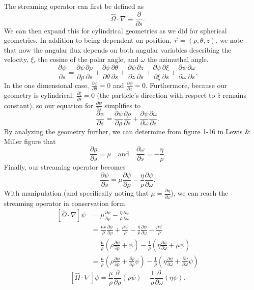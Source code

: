 \documentclass{article}
\newcommand{\p}{\partial}
\newcommand{\pos}{\vec{r}}
\newcommand{\Oh}{\hat{\Omega}}
\begin{document}
The streaming operator can first be defined as 
$$ \Oh \cdot \nabla \equiv \frac{\p}{\p s} .$$
We can then expand this for cylindrical geometries as we did for spherical geometries. In addition to being dependent on position, $\pos = (\rho,\theta,z)$, we note that now the angular flux depends on both angular variables describing the velocity, $\xi$, the cosine of the polar angle, and $\omega$ the azimuthal angle. 
$$ \frac{\p \psi}{\p s} = \frac{\p \psi}{\p \rho}\frac{\p \rho}{\p s} + \frac{\p \psi}{\p \theta}\frac{\p \theta}{\p s} + \frac{\p \psi}{\p z}\frac{\p z}{\p s} + \frac{\p \psi}{\p \xi}\frac{\p \xi}{\p s} + \frac{\p \psi}{\p \omega}\frac{\p \omega}{\p s} .$$
In the one dimensional case, $\frac{\p \psi}{\p \theta} = 0$ and $\frac{\p \psi}{\p z} = 0$. Furthermore, because our geometry is cylindrical, $\frac{\p \xi}{\p s} = 0$ (the particle's direction with respect to $\hat{z}$ remains constant),  so our equation for $\frac{\p \psi}{\p s}$ simplifies to
$$ \frac{\p \psi}{\p s} = \frac{\p \psi}{\p \rho}\frac{\p \rho}{\p s} + \frac{\p \psi}{\p \omega}\frac{\p \omega}{\p s} .$$
By analyzing the geometry further, we can determine from figure 1-16 in Lewis \& Miller figure that
$$ \frac{\p \rho}{\p s} = \mu \quad \text{and} \quad \frac{\p \omega}{\p s} = -\frac{\eta}{\rho}.$$
Finally, our streaming operator becomes
$$ \frac{\p \psi}{\p s} = \mu \frac{\p \psi}{\p \rho} -\frac{\eta}{\rho}\frac{\p \psi}{\p \omega} .$$
With manipulation (and specifically noting that $\mu = \frac{\p \eta}{\p \omega}$), we can reach the streaming operator in conservation form.
\begin{align*}
\left[ \Oh \cdot \nabla \right] \psi	&=  \mu \frac{\p \psi}{\p \rho} -\frac{\eta}{\rho}\frac{\p \psi}{\p \omega}\\
										&=  \frac{\mu \rho}{\rho} \frac{\p \psi}{\p \rho} + \frac{\mu\psi}{\rho} -\frac{\eta}{\rho}\frac{\p \psi}{\p \omega} - \frac{\mu\psi}{\rho} \\
										&= \frac{\mu}{\rho} \left(\rho \frac{\p \psi}{\p \rho} + \psi \right) - \frac{1}{\rho} \left( \eta\frac{\p \psi}{\p \omega} + \mu\psi \right)\\
										&= \frac{\mu}{\rho} \left(\rho \frac{\p \psi}{\p \rho} + \frac{\p \rho}{\p \rho} \psi \right) - \frac{1}{\rho} \left( \eta\frac{\p \psi}{\p \omega} + \frac{\p \eta}{\p \omega} \psi \right)
\end{align*}
$$\boxed{ \left[ \Oh \cdot \nabla \right] \psi = \frac{\mu}{\rho} \frac{\p}{\p \rho}\left( \rho\psi \right) - \frac{1}{\rho} \frac{\p}{\p \omega}\left( \eta\psi \right) }.$$
\end{document}
